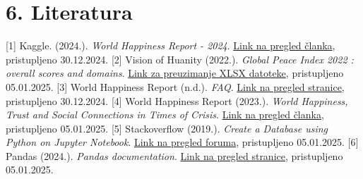 \documentclass[11pt]{article}
\begin{document}
    \hypertarget{literatura}{%
\section{6. Literatura}\label{literatura}}

{[}1{]} Kaggle. (2024.). \emph{World Happiness Report - 2024}.
\href{https://www.kaggle.com/datasets/jainaru/world-happiness-report-2024-yearly-updated?select=World-happiness-report-updated_2024.csv}{Link
na pregled članka}, pristupljeno 30.12.2024. {[}2{]} Vision of Huanity
(2022.). \emph{Global Peace Index 2022 : overall scores and domains}.
\href{https://www.visionofhumanity.org/wp-content/uploads/2022/06/GPI-2022-overall-scores-and-domains-2008-2022.xlsx}{Link
za preuzimanje XLSX datoteke}, pristupljeno 05.01.2025. {[}3{]} World
Happiness Report (n.d.). \emph{FAQ}.
\href{https://worldhappiness.report/faq/}{Link na pregled stranice},
pristupljeno 30.12.2024. {[}4{]} World Happiness Report (2023.).
\emph{World Happiness, Trust and Social Connections in Times of Crisis}.
\href{https://worldhappiness.report/ed/2023/world-happiness-trust-and-social-connections-in-times-of-crisis/}{Link
na pregled članka}, pristupljeno 05.01.2025. {[}5{]} Stackoverflow
(2019.). \emph{Create a Database using Python on Jupyter Notebook}.
\href{https://stackoverflow.com/questions/52122119/create-database-using-python-on-jupyter-notebook}{Link
na pregled foruma}, pristupljeno 05.01.2025. {[}6{]} Pandas (2024.).
\emph{Pandas documentation}.
\href{https://pandas.pydata.org/docs/index.html}{Link na pregled
stranice}, pristupljeno 05.01.2025.


    
    
    
\end{document}
